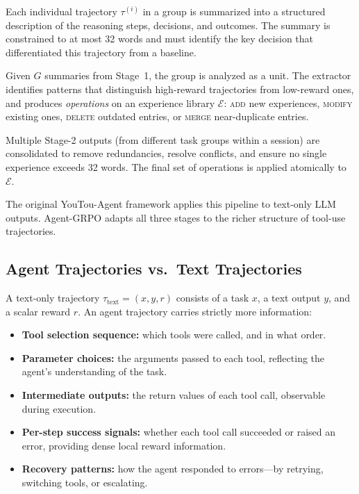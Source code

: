 \documentclass[11pt]{article}
\begin{document}
\begin{description}[leftmargin=1.5em, font=\normalfont\bfseries]
    \item[Stage 1 -- Trajectory Summarization.]
    Each individual trajectory $\tau^{(i)}$ in a group is summarized into a
    structured description of the reasoning steps, decisions, and outcomes. The
    summary is constrained to at most 32 words and must identify the key
    decision that differentiated this trajectory from a baseline.

    \item[Stage 2 -- Group Advantage Extraction.]
    Given $G$ summaries from Stage~1, the group is analyzed as a unit. The
    extractor identifies patterns that distinguish high-reward trajectories from
    low-reward ones, and produces \emph{operations} on an experience library
    $\mathcal{E}$: \textsc{add} new experiences, \textsc{modify} existing ones,
    \textsc{delete} outdated entries, or \textsc{merge} near-duplicate entries.

    \item[Stage 3 -- Batch Consolidation.]
    Multiple Stage-2 outputs (from different task groups within a session) are
    consolidated to remove redundancies, resolve conflicts, and ensure no single
    experience exceeds 32 words. The final set of operations is applied atomically
    to $\mathcal{E}$.
\end{description}

The original YouTou-Agent framework applies this pipeline to text-only LLM
outputs. Agent-GRPO adapts all three stages to the richer structure of
tool-use trajectories.

\subsection{Agent Trajectories vs.\ Text Trajectories}
\label{sec:traj-comparison}

A text-only trajectory $\tau_{\text{text}} = (x, y, r)$ consists of a task
$x$, a text output $y$, and a scalar reward $r$. An agent trajectory carries
strictly more information:

\begin{itemize}[leftmargin=1.5em]
    \item \textbf{Tool selection sequence:} which tools were called, and in what
          order.
    \item \textbf{Parameter choices:} the arguments passed to each tool,
          reflecting the agent's understanding of the task.
    \item \textbf{Intermediate outputs:} the return values of each tool call,
          observable during execution.
    \item \textbf{Per-step success signals:} whether each tool call succeeded
          or raised an error, providing dense local reward information.
    \item \textbf{Recovery patterns:} how the agent responded to errors---by
          retrying, switching tools, or escalating.
\end{itemize}
\end{document}
